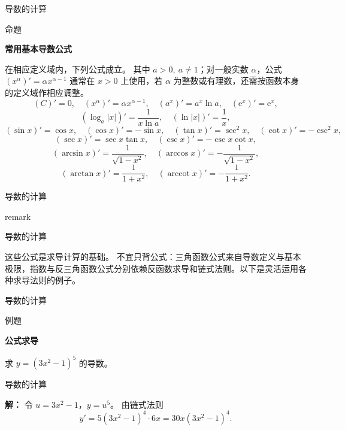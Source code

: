 \documentclass[aspectratio=169,10pt,fontset=fandol]{ctexbeamer}
\newcommand{\ee}{\mathrm{e}}
\begin{document}
\begin{frame}[t,fragile]{导数的计算}
\footnotesize
\begin{block}{命题}
{\footnotesize
\textbf{常用基本导数公式}\par

	在相应定义域内，下列公式成立。 其中 $a>0,\ a\neq1$；对一般实数 $\alpha$，公式 $(x^\alpha)'=\alpha x^{\alpha-1}$ 通常在 $x>0$ 上使用，若 $\alpha$ 为整数或有理数，还需按函数本身的定义域作相应调整。
	\[
	(C)'=0,\quad (x^\alpha)'=\alpha x^{\alpha-1},\quad (a^x)'=a^x\ln a,\quad (\ee^x)'=\ee^x,
	\]
	\[
	(\log_a |x|)'=\frac1{x\ln a},\quad (\ln |x|)'=\frac1x,
	\]
	\[
	(\sin x)'=\cos x,\quad (\cos x)'=-\sin x,\quad
	(\tan x)'=\sec^2x,\quad (\cot x)'=-\csc^2x,
	\]
	\[
	(\sec x)'=\sec x\tan x,\quad (\csc x)'=-\csc x\cot x,
	\]
	\[
	(\arcsin x)'=\frac1{\sqrt{1-x^2}},\quad
	(\arccos x)'=-\frac1{\sqrt{1-x^2}},
	\]
	\[
	(\arctan x)'=\frac1{1+x^2},\quad
	(\operatorname{arccot}x)'=-\frac1{1+x^2}.
	\]

}
\end{block}
\end{frame}
\begin{frame}[t,fragile]{导数的计算}
\footnotesize
{\footnotesize
remark

}
\end{frame}
\begin{frame}[t,fragile]{导数的计算}
\footnotesize
{\footnotesize
这些公式是求导计算的基础。 不宜只背公式：三角函数公式来自导数定义与基本极限，指数与反三角函数公式分别依赖反函数求导和链式法则。以下是灵活运用各种求导法则的例子。

}
\end{frame}
\begin{frame}[t,fragile]{导数的计算}
\footnotesize
\begin{block}{例题}
{\footnotesize
\textbf{公式求导}\par

	求 $y=(3x^2-1)^5$ 的导数。

}
\end{block}
\end{frame}
\begin{frame}[t,fragile]{导数的计算}
\footnotesize
{\footnotesize
\textbf{解：}
令 $u=3x^2-1$，$y=u^5$。 由链式法则
	\[
	y'=5(3x^2-1)^4\cdot6x=30x(3x^2-1)^4.
	\]

}
\end{frame}
\end{document}
